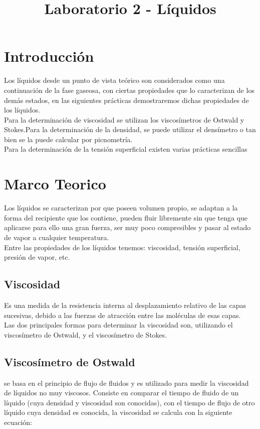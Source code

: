 \documentclass[11pt, letterpaper]{article}
\title{Laboratorio 2 - Líquidos}
\begin{document}
\maketitle
\section{Introducción}
Los líquidos desde un punto de vista teórico son considerados como   una continuación de la fase gaseosa, con ciertas propiedades que lo caracterizan de los demás estados, en las siguientes prácticas demostraremos dichas propiedades de los líquidos.\\

Para la determinación de viscosidad se utilizan los viscosímetros de Ostwald y Stokes.Para la determinación de la densidad, se puede utilizar el densímetro o tan bien se la puede calcular por picnometría.\\

Para la determinación de la tensión superficial existen varias prácticas sencillas
\section{Marco Teorico}
Los líquidos se caracterizan por que poseen volumen propio, se adaptan a la forma del recipiente que los contiene, pueden fluir libremente sin que tenga que aplicarse para ello una gran fuerza, ser muy poco compresibles y pasar al estado de vapor a cualquier temperatura.\\

Entre las propiedades de los líquidos tenemos:  viscosidad, tensión superficial, presión de vapor, etc.
\subsection{Viscosidad}
Es una medida de la resistencia interna al desplazamiento relativo de las capas sucesivas, debido a las fuerzas de atracción entre las  moléculas de esas capas.\\

Las dos principales formas para determinar la viscosidad son,   utilizando el viscosímetro de Ostwald, y el viscosímetro de Stokes.
\subsection{Viscosímetro de Ostwald}
se basa en el principio de flujo de fluidos y es utilizado para  medir  la  viscosidad  de  líquidos  no  muy  viscosos.  Consiste  en  comparar  el tiempo  de  fluido  de  un  líquido  (cuya  densidad  y  viscosidad  son  conocidas),  con  el tiempo de flujo de otro líquido cuya densidad  es conocida, la viscosidad se calcula con la siguiente ecuación:
\end{document}
